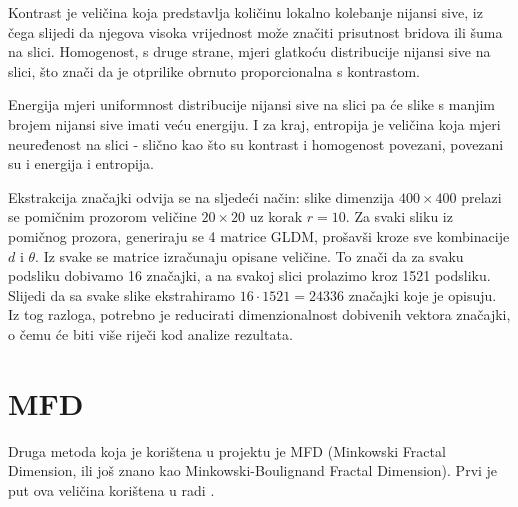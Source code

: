 \documentclass{report}
\begin{document}
Kontrast je veličina koja predstavlja količinu lokalno kolebanje nijansi sive, iz čega slijedi da njegova visoka vrijednost može značiti prisutnost bridova ili šuma na slici. Homogenost, s druge strane, mjeri glatkoću distribucije nijansi sive na slici, što znači da je otprilike obrnuto proporcionalna s kontrastom.

Energija mjeri uniformnost distribucije nijansi sive na slici pa će slike s manjim brojem nijansi sive imati veću energiju. I za kraj, entropija je veličina koja mjeri neuređenost na slici - slično kao što su kontrast i homogenost povezani, povezani su i energija i entropija.

Ekstrakcija značajki odvija se na sljedeći način: slike dimenzija $400 \times 400$ prelazi se pomičnim prozorom veličine $20 \times 20$ uz korak $r = 10$. Za svaki sliku iz pomičnog prozora, generiraju se 4 matrice GLDM, prošavši kroze sve kombinacije $d$ i $\theta$. Iz svake se matrice izračunaju opisane veličine. To znači da za svaku podsliku dobivamo 16 značajki, a na svakoj slici prolazimo kroz 1521 podsliku. Slijedi da sa svake slike ekstrahiramo $16 \cdot 1521 = 24336$ značajki koje je opisuju. Iz tog razloga, potrebno je reducirati dimenzionalnost dobivenih vektora značajki, o čemu će biti više riječi kod analize rezultata.

\section{MFD}
Druga metoda koja je korištena u projektu je MFD (Minkowski Fractal Dimension, ili još znano kao Minkowski-Boulignand Fractal Dimension). Prvi je put ova veličina korištena u radi \cite{mfd}.

\nocite{phasecong_impl}
	
\end{document}
